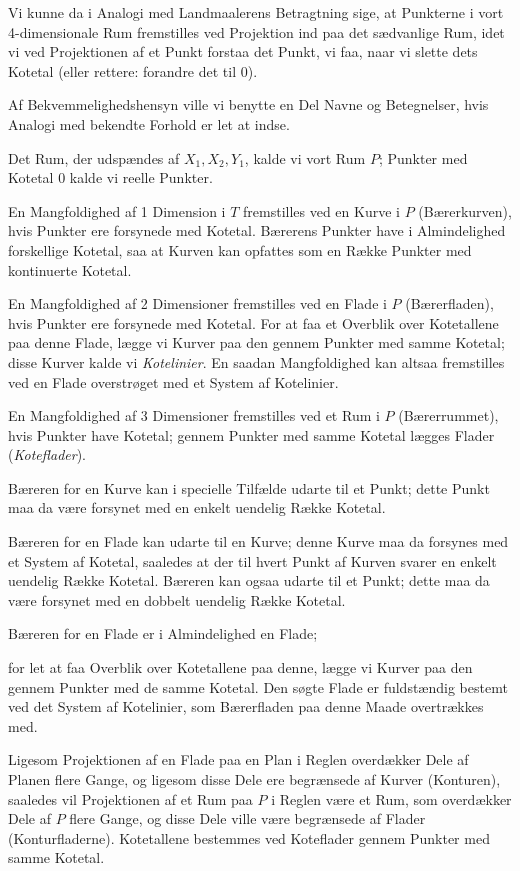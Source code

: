 \documentclass{article}
\begin{document}
Vi kunne da i Analogi med Landmaalerens Betragtning sige, at Punkterne i vort 4-dimensionale Rum fremstilles ved Projektion ind paa det sædvanlige Rum, idet vi ved Projektionen af et Punkt forstaa det Punkt, vi faa, naar vi slette dets Kotetal (eller rettere: forandre det til 0).

Af Bekvemmelighedshensyn ville vi benytte en Del Navne og Betegnelser, hvis Analogi med bekendte Forhold er let at indse.

Det Rum, der udspændes af $X_1, X_2, Y_1$, kalde vi vort Rum $P$; Punkter med Kotetal 0 kalde vi reelle Punkter.

En Mangfoldighed af 1 Dimension i $T$ fremstilles ved en Kurve i $P$ (Bærerkurven), hvis Punkter ere forsynede med Kotetal. Bærerens Punkter have i Almindelighed forskellige Kotetal, saa at Kurven kan opfattes som en Række Punkter med kontinuerte Kotetal.

En Mangfoldighed af 2 Dimensioner fremstilles ved en Flade i $P$ (Bærerfladen), hvis Punkter ere forsynede med Kotetal. For at faa et Overblik over Kotetallene paa denne Flade, lægge vi Kurver paa den gennem Punkter med samme Kotetal; disse Kurver kalde vi \emph{Kotelinier}. En saadan Mangfoldighed kan altsaa fremstilles ved en Flade overstrøget med et System af Kotelinier.

En Mangfoldighed af 3 Dimensioner fremstilles ved et Rum i $P$ (Bærerrummet), hvis Punkter have Kotetal; gennem Punkter med samme Kotetal lægges Flader (\emph{Koteflader}).

Bæreren for en Kurve kan i specielle Tilfælde udarte til et Punkt; dette Punkt maa da være forsynet med en enkelt uendelig Række Kotetal.

Bæreren for en Flade kan udarte til en Kurve; denne Kurve maa da forsynes med et System af Kotetal, saaledes at der til hvert Punkt af Kurven svarer en enkelt uendelig Række Kotetal. Bæreren kan ogsaa udarte til et Punkt; dette maa da være forsynet med en dobbelt uendelig Række Kotetal.

Bæreren for en Flade er i Almindelighed en Flade;

for let at faa Overblik over Kotetallene paa denne, lægge vi Kurver paa den gennem Punkter med de samme Kotetal. Den søgte Flade er fuldstændig bestemt ved det System af Kotelinier, som Bærerfladen paa denne Maade overtrækkes med.

Ligesom Projektionen af en Flade paa en Plan i Reglen overdækker Dele af Planen flere Gange, og ligesom disse Dele ere begrænsede af Kurver (Konturen), saaledes vil Projektionen af et Rum paa $P$ i Reglen være et Rum, som overdækker Dele af $P$ flere Gange, og disse Dele ville være begrænsede af Flader (Konturfladerne). Kotetallene bestemmes ved Koteflader gennem Punkter med samme Kotetal.
\end{document}
